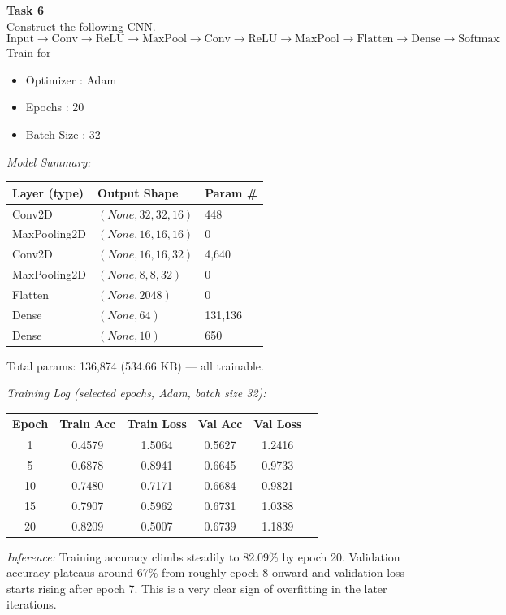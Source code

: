 \documentclass[11pt]{article}
\begin{document}
\textbf{Task 6} \\
Construct the following CNN.
\[
\text{Input} \rightarrow \text{Conv} \rightarrow \text{ReLU} \rightarrow \text{MaxPool} \rightarrow \text{Conv} \rightarrow \text{ReLU} \rightarrow \text{MaxPool} \rightarrow \text{Flatten} \rightarrow \text{Dense} \rightarrow \text{Softmax}
\]
Train for
\begin{itemize}
    \item Optimizer : Adam
    \item Epochs : 20
    \item Batch Size : 32
\end{itemize}

\textit{Model Summary:}
\begin{center}
\begin{tabular}{lll}
\toprule
\textbf{Layer (type)} & \textbf{Output Shape} & \textbf{Param \#} \\
\midrule
Conv2D          & $(None, 32, 32, 16)$ & 448 \\
MaxPooling2D    & $(None, 16, 16, 16)$ & 0 \\
Conv2D          & $(None, 16, 16, 32)$ & 4{,}640 \\
MaxPooling2D    & $(None, 8, 8, 32)$   & 0 \\
Flatten         & $(None, 2048)$       & 0 \\
Dense           & $(None, 64)$         & 131{,}136 \\
Dense           & $(None, 10)$         & 650 \\
\bottomrule
\end{tabular}
\end{center}
Total params: 136{,}874 (534.66 KB) --- all trainable.

\textit{Training Log (selected epochs, Adam, batch size 32):}
\begin{center}
\begin{tabular}{cccccc}
\toprule
\textbf{Epoch} & \textbf{Train Acc} & \textbf{Train Loss} & \textbf{Val Acc} & \textbf{Val Loss} \\
\midrule
1  & 0.4579 & 1.5064 & 0.5627 & 1.2416 \\
5  & 0.6878 & 0.8941 & 0.6645 & 0.9733 \\
10 & 0.7480 & 0.7171 & 0.6684 & 0.9821 \\
15 & 0.7907 & 0.5962 & 0.6731 & 1.0388 \\
20 & 0.8209 & 0.5007 & 0.6739 & 1.1839 \\
\bottomrule
\end{tabular}
\end{center}
\textit{Inference:} Training accuracy climbs steadily to 82.09\% by epoch 20. Validation accuracy plateaus around 67\% from roughly epoch 8 onward and validation loss starts rising after epoch 7. This is a very clear sign of overfitting in the later  iterations.
\end{document}
